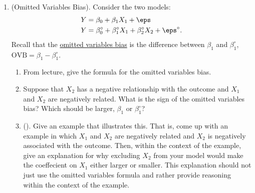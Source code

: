 \documentclass[10pt]{article}
\begin{document}
\begin{enumerate}
	\item (Omitted Variables Bias). Consider the two models:
	\begin{align*}
		Y &= \beta_0 + \beta_1X_1 + \eps \\
		Y &= \beta_0^\circ + \beta_1^\circ X_1 + \beta_2^\circ X_2 + \eps^\circ
	.\end{align*}
	Recall that the \underline{omitted variables bias}  is the difference between  \(\beta_1\) and  \(\beta_1^\circ\),  \(\text{OVB} = \beta_1 - \beta_1^\circ\).
	\begin{enumerate}
		\item From lecture, give the formula for the omitted variables bias.
		\item Suppose that \(X_2\) has a negative relationship with the outcome and  \(X_1\) and  \(X_2\) are negatively related. What is the sign of the omitted variables bias? Which should be larger, \(\beta_1\) or  \(\beta_1^\circ\)?
		\item (). Give an example that illustrates this. That is, come up with an example in which \(X_1\) and  \(X_2\) are negatively related and  \(X_2\) is negatively associated with the outcome. Then, within the context of the example, give an explanation for why excluding \(X_2\) from your model would make the coeffecient on  \(X_1\) either larger or smaller. This explanation should not just use the omitted variables formula and rather provide reasoning within the context of the example.	
	\end{enumerate}
\end{enumerate}
\end{document}
